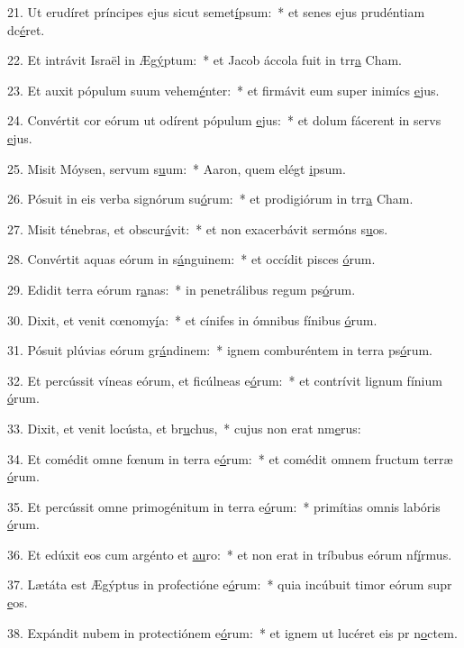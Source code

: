 21. Ut erudíret príncipes ejus sicut semet\uline{í}psum:~* et senes ejus prudéntiam dc\uline{é}ret.\par 
22. Et intrávit Israël in Æg\uline{ý}ptum:~* et Jacob áccola fuit in trr\uline{a} Cham.\par 
23. Et auxit pópulum suum vehem\uline{é}nter:~* et firmávit eum super inimícs \uline{e}jus.\par 
24. Convértit cor eórum ut odírent pópulum \uline{e}jus:~* et dolum fácerent in servs \uline{e}jus.\par 
25. Misit Móysen, servum s\uline{u}um:~* Aaron, quem elégt \uline{i}psum.\par 
26. Pósuit in eis verba signórum su\uline{ó}rum:~* et prodigiórum in trr\uline{a} Cham.\par 
27. Misit ténebras, et obscur\uline{á}vit:~* et non exacerbávit sermóns s\uline{u}os.\par 
28. Convértit aquas eórum in s\uline{á}nguinem:~* et occídit pisces \uline{ó}rum.\par 
29. Edidit terra eórum r\uline{a}nas:~* in penetrálibus regum ps\uline{ó}rum.\par 
30. Dixit, et venit cœnomy\uline{í}a:~* et cínifes in ómnibus fínibus \uline{ó}rum.\par 
31. Pósuit plúvias eórum gr\uline{á}ndinem:~* ignem comburéntem in terra ps\uline{ó}rum.\par 
32. Et percússit víneas eórum, et ficúlneas e\uline{ó}rum:~* et contrívit lignum fínium \uline{ó}rum.\par 
33. Dixit, et venit locústa, et br\uline{u}chus,~* cujus non erat nm\uline{e}rus:\par 
34. Et comédit omne fœnum in terra e\uline{ó}rum:~* et comédit omnem fructum terræ \uline{ó}rum.\par 
35. Et percússit omne primogénitum in terra e\uline{ó}rum:~* primítias omnis labóris \uline{ó}rum.\par 
36. Et edúxit eos cum argénto et \uline{au}ro:~* et non erat in tríbubus eórum nf\uline{í}rmus.\par 
37. Lætáta est Ægýptus in profectióne e\uline{ó}rum:~* quia incúbuit timor eórum supr \uline{e}os.\par 
38. Expándit nubem in protectiónem e\uline{ó}rum:~* et ignem ut lucéret eis pr n\uline{o}ctem.\par 
